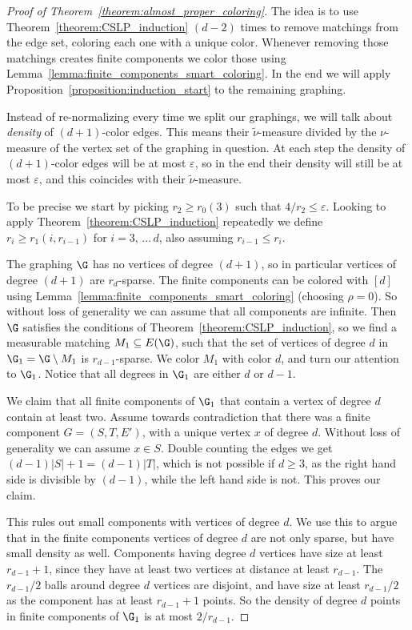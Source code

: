 
\begin{proof}[Proof of Theorem~\ref{theorem:almost_proper_coloring}]
The idea is to use Theorem~\ref{theorem:CSLP_induction} $(d-2)$ times to remove matchings from the edge set, coloring each one with a unique color. Whenever removing those matchings creates finite components we color those using Lemma~\ref{lemma:finite_components_smart_coloring}. In the end we will apply Proposition~\ref{proposition:induction_start} to the remaining graphing.

Instead of re-normalizing every time we split our graphings, we will talk about \emph{density} of $(d+1)$-color edges. This means their $\widetilde{\nu}$-measure divided by the $\nu$-measure of the vertex set of the graphing in question. At each step the density of $(d+1)$-color edges will be at most $\varepsilon$, so in the end their density will still be at most $\varepsilon$, and this coincides with their $\widetilde{\nu}$-measure.

To be precise we start by picking $r_2 \geq r_0(3)$ such that $4/r_2 \leq \varepsilon$. Looking to apply Theorem~\ref{theorem:CSLP_induction} repeatedly we define $r_i \geq r_1(i, r_{i-1})$ for $i=3,\,\ldots\,d$, also assuming $r_{i-1} \leq r_i$.

The graphing $\G$ has no vertices of degree $(d+1)$, so in particular vertices of degree $(d+1)$ are $r_d$-sparse. The finite components can be colored with $[d]$ using Lemma~\ref{lemma:finite_components_smart_coloring} (choosing $\rho =0$). So without loss of generality we can assume that all components are infinite. Then $\G$ satisfies the conditions of Theorem~\ref{theorem:CSLP_induction}, so we find a measurable matching $M_1 \subseteq E(\G)$, such that the set of vertices of degree $d$ in $\G_1=\G \setminus M_1$ is $r_{d-1}$-sparse. We color $M_1$ with color $d$, and turn our attention to $\G_1$. Notice that all degrees in $\G_1$ are either $d$ or $d-1$.

We claim that all finite components of $\G_1$ that contain a vertex of degree $d$ contain at least two. Assume towards contradiction that there was a finite component $G=(S,T, E')$, with a unique vertex $x$ of degree $d$. Without loss of generality we can assume $x \in S$. Double counting the edges we get $(d-1)|S|+1 = (d-1)|T|$, which is not possible if $d \geq 3$, as the right hand side is divisible by $(d-1)$, while the left hand side is not. This proves our claim.

This rules out small components with vertices of degree $d$. We use this to argue that in the finite components vertices of degree $d$ are not only sparse, but have small density as well. Components having degree $d$ vertices have size at least $r_{d-1}+1$, since they have at least two vertices at distance at least $r_{d-1}$. The $r_{d-1}/2$ balls around degree $d$ vertices are disjoint, and have size at least $r_{d-1}/2$ as the component has at least $r_{d-1}+1$ points. So the density of degree $d$ points in finite components of $\G_1$ is at most $2 / r_{d-1}$.


\end{proof}
